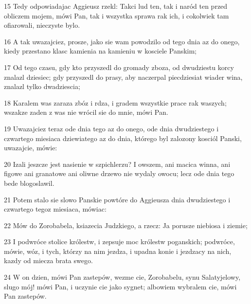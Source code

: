 \par 15 Tedy odpowiadajac Aggieusz rzekl: Takci lud ten, tak i naród ten przed obliczem mojem, mówi Pan, tak i wszystka sprawa rak ich, i cokolwiek tam ofiarowali, nieczyste bylo.
\par 16 A tak uwazajciez, prosze, jako sie wam powodzilo od tego dnia az do onego, kiedy przestano klasc kamienia na kamieniu w kosciele Panskim;
\par 17 Od tego czasu, gdy kto przyszedl do gromady zboza, od dwudziestu korcy znalazl dziesiec; gdy przyszedl do prasy, aby naczerpal piecdziesiat wiader wina, znalazl tylko dwadziescia;
\par 18 Karalem was zaraza zbóz i rdza, i gradem wszystkie prace rak waszych; wszakze zaden z was nie wrócil sie do mnie, mówi Pan.
\par 19 Uwazajciez teraz ode dnia tego az do onego, ode dnia dwudziestego i czwartego miesiaca dziewiatego az do dnia, którego byl zalozony kosciól Panski, uwazajcie, mówie:
\par 20 Izali jeszcze jest nasienie w szpichlerzu? I owszem, ani macica winna, ani figowe ani granatowe ani oliwne drzewo nie wydaly owocu; lecz ode dnia tego bede blogoslawil.
\par 21 Potem stalo sie slowo Panskie powtóre do Aggieusza dnia dwudziestego i czwartego tegoz miesiaca, mówiac:
\par 22 Mów do Zorobabela, ksiazecia Judzkiego, a rzecz: Ja porusze niebiosa i ziemie;
\par 23 I podwróce stolice królestw, i zepsuje moc królestw poganskich; podwróce, mówie, wóz, i tych, którzy na nim jezdza, i upadna konie i jezdzacy na nich, kazdy od miecza brata swego.
\par 24 W on dzien, mówi Pan zastepów, wezme cie, Zorobabelu, synu Salatyjelowy, slugo mój! mówi Pan, i uczynie cie jako sygnet; albowiem wybralem cie, mówi Pan zastepów.


